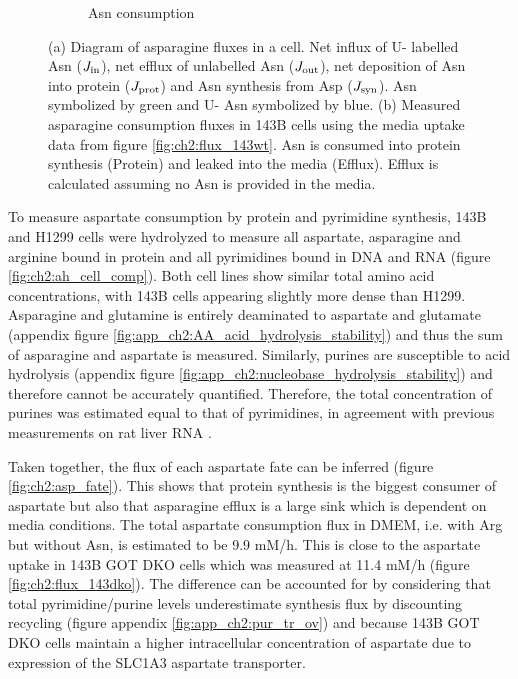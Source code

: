 \begin{figure}[ht]
\begin{subfigure}[b]{0.4\textwidth}
         \caption{Asn consumption}
         \label{fig:ch2:Asn_flux}
     \end{subfigure}
     \hspace{0.1\textwidth}
        \caption[Asparagine consumption fluxes.]{
        (a) Diagram of asparagine fluxes in a cell.
        Net influx of U-\hCi{} labelled Asn ($J_{\text{in}}$), net efflux of unlabelled Asn ($J_{\text{out}}$), net deposition of Asn into protein ($J_{\text{prot}}$) and Asn synthesis from Asp ($J_{\text{syn}}$).
        Asn symbolized by green and U-\hCi{} Asn symbolized by blue.
        (b) Measured asparagine consumption fluxes in 143B cells using the media uptake data from figure \ref{fig:ch2:flux_143wt}.
        Asn is consumed into protein synthesis (Protein) and leaked into the media (Efflux).
        Efflux is calculated assuming no Asn is provided in the media.
        }
\end{figure}




To measure aspartate consumption by protein and pyrimidine synthesis, 143B and H1299 cells were hydrolyzed to measure all aspartate, asparagine and arginine bound in protein and all pyrimidines bound in DNA and RNA (figure \ref{fig:ch2:ah_cell_comp}).
Both cell lines show similar total amino acid concentrations, with 143B cells appearing slightly more dense than H1299.
Asparagine and glutamine is entirely deaminated to aspartate and glutamate (appendix figure \ref{fig:app_ch2:AA_acid_hydrolysis_stability}) and thus the sum of asparagine and aspartate is measured.
Similarly, purines are susceptible to acid hydrolysis (appendix figure \ref{fig:app_ch2:nucleobase_hydrolysis_stability}) and therefore cannot be accurately quantified.
Therefore, the total concentration of purines was estimated equal to that of pyrimidines, in agreement with previous measurements on rat liver RNA \cite{Lipshitz1960-jw}.

Taken together, the flux of each aspartate fate can be inferred (figure \ref{fig:ch2:asp_fate}).
This shows that protein synthesis is the biggest consumer of aspartate but also that asparagine efflux is a large sink which is dependent on media conditions.
The total aspartate consumption flux in DMEM, i.e. with Arg but without Asn, is estimated to be 9.9 mM/h.
This is close to the aspartate uptake in 143B GOT DKO cells which was measured at 11.4 mM/h (figure \ref{fig:ch2:flux_143dko}).
The difference can be accounted for by considering that total pyrimidine/purine levels underestimate synthesis flux by discounting recycling (figure appendix \ref{fig:app_ch2:pur_tr_ov}) and because 143B GOT DKO cells maintain a higher intracellular concentration of aspartate due to expression of the SLC1A3 aspartate transporter.

